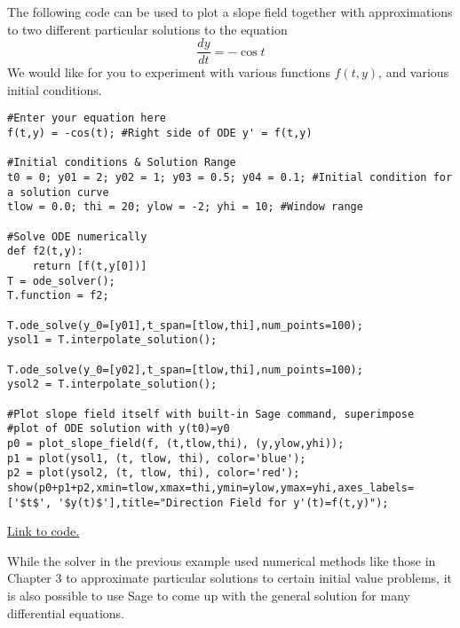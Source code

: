 \documentclass{ximera}
\begin{document}
\begin{example}\label{ex:sageSlopeFieldAndSolutions}   
The following code can be used to plot a slope field together with approximations to two different particular solutions to the equation
\[
\frac{dy}{dt}=-\cos t
\]
We would like for you to experiment with various functions $f(t,y)$, and various initial conditions.
    \begin{verbatim}
#Enter your equation here
f(t,y) = -cos(t); #Right side of ODE y' = f(t,y)

#Initial conditions & Solution Range
t0 = 0; y01 = 2; y02 = 1; y03 = 0.5; y04 = 0.1; #Initial condition for a solution curve
tlow = 0.0; thi = 20; ylow = -2; yhi = 10; #Window range

#Solve ODE numerically
def f2(t,y):
    return [f(t,y[0])]
T = ode_solver();
T.function = f2;

T.ode_solve(y_0=[y01],t_span=[tlow,thi],num_points=100);
ysol1 = T.interpolate_solution();

T.ode_solve(y_0=[y02],t_span=[tlow,thi],num_points=100);
ysol2 = T.interpolate_solution();

#Plot slope field itself with built-in Sage command, superimpose
#plot of ODE solution with y(t0)=y0
p0 = plot_slope_field(f, (t,tlow,thi), (y,ylow,yhi));
p1 = plot(ysol1, (t, tlow, thi), color='blue');
p2 = plot(ysol2, (t, tlow, thi), color='red');
show(p0+p1+p2,xmin=tlow,xmax=thi,ymin=ylow,ymax=yhi,axes_labels=['$t$', '$y(t)$'],title="Direction Field for y'(t)=f(t,y)");
 \end{verbatim}

    \href{https://sagecell.sagemath.org/?z=eJyNU8GK2zAQvRv8D8M61DarBNttLw2-7RZ6atkN9BCCUWw5EciSKsmb6O87kneXQndpc5pM3nvz5o2S3UvHDHg1G2C_Zuq4knBmhqXJWDjiS2hh3StbuHIL2QM_nR1YPjBQI3y_uwefI2BBpkmaZN8kd5wK6JUceBCz8AEelZij8AOVJ1R2FZKqLfiqxqIJRYNFHYqP4afN51B-iiV2_1aFURmgYF-E-9k8BWGhLpGE4u7Mg3gYs3TXYVBs1tjMfnI5YN8sltA6unxicSk5T8zwngrh02RgI4xN3PBLmgB-DHOzkbCPa--rQ3lIkx3KqoF1NoiYotxiazPOso_2MKJmG4bsNq-gwndVu8cIDsR1VlPZ7oN9gr4PBB10WnHpbFtXVVDzSApp7TY8XEwrQV1UigHEgW_KN_8v3_xLPvshFJ5fKM1g5EwMwJ1lYoQLd2c4zly4NZfwSE8MTzVNVA4E7KwxzEkrizFnOig8v53X60W6L1xVtr5KEx2eRwB2cVQXRxUjAcz7ZYcSv3kSLkvwpmXwp-tnWhGzinCIeFgIvRLKtPlRzCyPhOZPQvMuwbAh4u1ZXQpd3er6VjfkOnHZRvR1otcWGcSH1uIptNAYoVdmO0GPTNh2n6_cKieQr3DXcpXjZbgTrL2544YtD-VrTDU8bp8jpl3-WTfl9jeO2Sb5&lang=sage&interacts=eJyLjgUAARUAuQ==}{Link to code.}
\end{example}

While the solver in the previous example used numerical methods like those in Chapter 3 to approximate particular solutions to certain initial value problems, it is also possible to use Sage to come up with the general solution for many differential equations.
\end{document}
